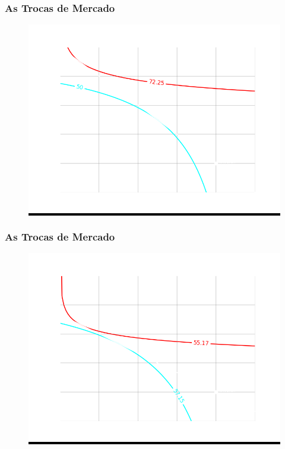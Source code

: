 \documentclass{beamer}[10]
\begin{document}
\begin{frame}
	\frametitle{As Trocas de Mercado}

	\begin{figure}[H]
		\centering
		\colorbox{black}{\includegraphics[scale=0.6]{cap32_4-caixa_edgeworth_4.png}}
	\end{figure}
		
\end{frame}

\begin{frame}
	\frametitle{As Trocas de Mercado}

	\begin{figure}[H]
		\centering
		\colorbox{black}{\includegraphics[scale=0.6]{cap32_4-caixa_edgeworth_5.png}}
	\end{figure}

\end{frame}
\end{document}
